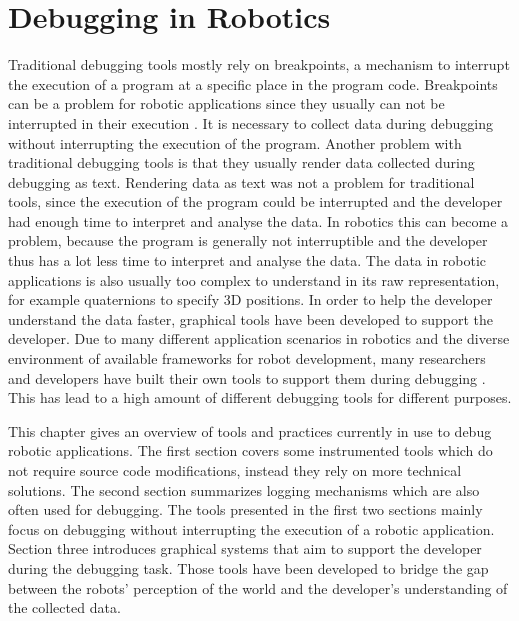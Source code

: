 \chapter{Debugging in Robotics}
\label{debugging_in_robotics}

Traditional debugging tools mostly rely on breakpoints, a mechanism to interrupt the execution of a program at a specific place in the program code. Breakpoints can be a problem for robotic applications since they usually can not be interrupted in their execution \cite{Gumbley2009}. It is necessary to collect data during debugging without interrupting the execution of the program.
Another problem with traditional debugging tools is that they usually render data collected during debugging as text. Rendering data as text was not a problem for traditional tools, since the execution of the program could be interrupted and the developer had enough time to interpret and analyse the data. In robotics this can become a problem, because the program is generally not interruptible and the developer thus has a lot less time to interpret and analyse the data. The data in robotic applications is also usually too complex to understand in its raw representation, for example quaternions to specify 3D positions. In order to help the developer understand the data faster, graphical tools have been developed to support the developer. Due to many different application scenarios in robotics and the diverse environment of available frameworks for robot development, many researchers and developers have built their own tools to support them during debugging \cite{Collett2010}. This has lead to a high amount of different debugging tools for different purposes.

This chapter gives an overview of tools and practices currently in use to debug robotic applications. The first section covers some instrumented tools which do not require source code modifications, instead they rely on more technical solutions. The second section summarizes logging mechanisms which are also often used for debugging. The tools presented in the first two sections mainly focus on debugging without interrupting the execution of a robotic application. Section three introduces graphical systems that aim to support the developer during the debugging task. Those tools have been developed to bridge the gap between the robots' perception of the world and the developer's understanding of the collected data.

